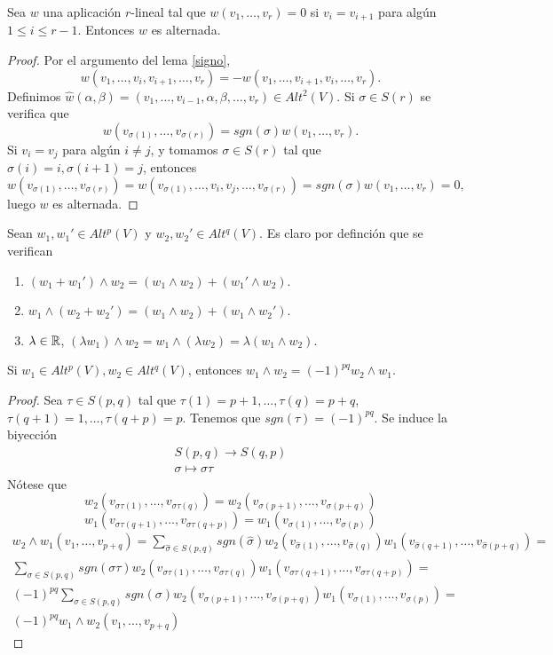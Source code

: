 \documentclass[CV.tex]{subfiles}
\begin{document}
\begin{lemma} Sea $w$ una aplicación $r$-lineal tal que $w(v_1,\dots, v_r)=0$ si $v_i=v_{i+1}$ para algún $1\leq i\leq r-1$. Entonces $w$ es alternada.
\end{lemma}
\begin{proof}
Por el argumento del lema \ref{signo}, 
$$w(v_1,\dots,v_i,v_{i+1},\dots, v_r)=-w(v_1,\dots,v_{i+1},v_i,\dots, v_r).$$
Definimos $\hat{w}(\alpha,\beta)=(v_1,\dots,v_{i-1},\alpha,\beta,\dots, v_r)\in Alt^2(V)$. Si $\sigma\in S(r)$ se verifica que
$$w(v_{\sigma(1)},\dots, v_{\sigma(r)})=sgn(\sigma)w(v_1,\dots, v_r).$$
Si $v_i=v_j$ para algún $i\neq j$, y tomamos $\sigma\in S(r)$ tal que $\sigma(i)=i, \sigma(i+1)=j$, entonces
$$w(v_{\sigma(1)},\dots,v_{\sigma(r)})=w(v_{\sigma(1)},\dots,v_i,v_j,\dots,v_{\sigma(r)})=sgn(\sigma)w(v_1,\dots, v_r)=0,$$
luego $w$ es alternada.

\end{proof}

\begin{propi} 
Sean $w_1,w_1'\in Alt^p(V)$ y $w_2,w_2'\in Alt^q(V)$. Es claro por definción que se verifican
\begin{enumerate}
\item $(w_1+w_1')\land w_2=(w_1\land w_2)+(w_1'\land w_2)$.
\item $w_1\land (w_2+w_2')=(w_1\land w_2)+(w_1\land w_2')$.
\item $\lambda\in\mathbb{R}$, $(\lambda w_1)\land w_2=w_1\land (\lambda w_2)=\lambda (w_1\land w_2)$.
\end{enumerate}
\end{propi}

\begin{lemma}
Si $w_1\in Alt^p(V), w_2\in Alt^q(V)$, entonces $w_1\land w_2=(-1)^{pq}w_2\land w_1$.
\end{lemma}
\begin{proof}
Sea $\tau\in S(p,q)$ tal que $\tau(1)=p+1,\dots, \tau(q)=p+q$, $\tau(q+1)=1,\dots,\tau(q+p)=p$. Tenemos que $sgn(\tau)=(-1)^{pq}$. Se induce la biyección
\begin{gather*}
S(p,q)\longrightarrow S(q,p)\\
\sigma\longmapsto \sigma\tau
\end{gather*}
Nótese que
$$w_2(v_{\sigma\tau(1)},\dots,v_{\sigma\tau(q)})=w_2(v_{\sigma(p+1)},\dots, v_{\sigma(p+q)})$$
$$w_1(v_{\sigma\tau(q+1)},\dots,v_{\sigma\tau(q+p)})=w_1(v_{\sigma(1)},\dots, v_{\sigma(p)})$$
\begin{gather*}
w_2\land w_1(v_1,\dots, v_{p+q})=\sum_{\hat{\sigma}\in S(p,q)}sgn(\hat{\sigma})w_2(v_{\hat{\sigma}(1)},\dots, v_{\hat{\sigma}(q)})w_1(v_{\hat{\sigma}(q+1)},\dots, v_{\hat{\sigma}(p+q)})=\\
\sum_{\sigma\in S(p,q)}sgn(\sigma\tau)w_2(v_{\sigma\tau(1)},\dots, v_{\sigma\tau(q)})w_1(v_{\sigma\tau(q+1)},\dots, v_{\sigma\tau(q+p)})=\\
(-1)^{pq}\sum_{\sigma\in S(p,q)}sgn(\sigma)w_2(v_{\sigma(p+1)},\dots,v_{\sigma(p+q)})w_1(v_{\sigma(1)},\dots, v_{\sigma(p)})=\\
(-1)^{pq}w_1\land w_2(v_1,\dots, v_{p+q})
\end{gather*}
\end{proof}
\end{document}
